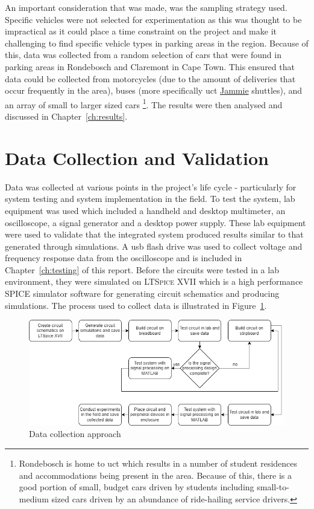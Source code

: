 \documentclass[class=report,11pt,crop=false]{standalone}
\begin{document}
An important consideration that was made, was the sampling strategy used. Specific vehicles were not selected for experimentation as this was thought to be impractical as it could place a time constraint on the project and make it challenging to find specific vehicle types in parking areas in the region. Because of this, data was collected from a random selection of cars that were found in parking areas in Rondebosch and Claremont in Cape Town. This ensured that data could be collected from motorcycles (due to the amount of deliveries that occur frequently in the area), buses (more specifically \gls{uct} \href{https://uct.ac.za/students/services-transport-parking-uct-shuttle/uct-shuttle-overview}{Jammie} shuttles), and an array of small to larger sized cars \footnote{Rondebosch is home to \gls{uct} which results in a number of student residences and accommodations being present in the area. Because of this, there is a good portion of small, budget cars driven by students including small-to-medium sized cars driven by an abundance of ride-hailing service drivers.}. The results were then analysed and discussed in Chapter~\ref{ch:results}.


\section{Data Collection and Validation}
Data was collected at various points in the project's life cycle - particularly for system testing and system implementation in the field. To test the system, lab equipment was used which included a handheld and desktop multimeter, an oscilloscope, a signal generator and a desktop power supply. These lab equipment were used to validate that the integrated system produced results similar to that generated through simulations. A \gls{usb} flash drive was used to collect voltage and frequency response data from the oscilloscope and is included in Chapter~\ref{ch:testing} of this report. Before the circuits were tested in a lab environment, they were simulated on \textsc{LTSpice XVII} which is a high performance \textsc{SPICE} simulator software for generating circuit schematics and producing simulations. The process used to collect data is illustrated in Figure~\ref{fig:data-collection}.

\begin{figure}[htbp]
    \centering
    \includegraphics[width=0.8\columnwidth]{../Images/data_collection_methodology.drawio.png}
    \caption{Data collection approach}
    \label{fig:data-collection}
\end{figure}
\end{document}
